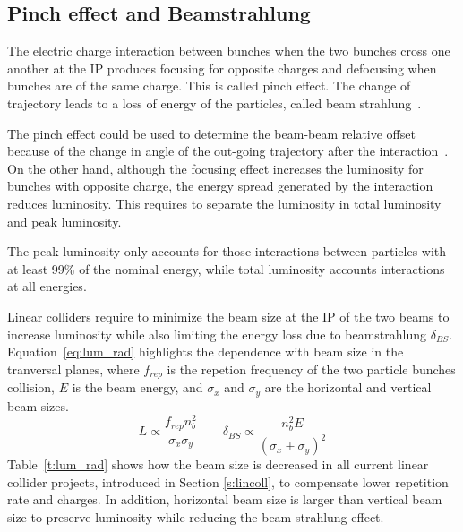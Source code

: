 \subsection{Pinch effect and Beamstrahlung}\label{s:beastr}
The electric charge interaction between bunches when the two bunches cross one another at the IP produces focusing for opposite charges and defocusing when bunches are of the same charge. This is called pinch effect. The change of trajectory leads to a loss of energy of the particles, called beam strahlung~\cite{Schulte:331845}.\par
The pinch effect could be used to determine the beam-beam relative offset because of the change in angle of the out-going trajectory after the interaction~\cite{Bambade:1989pb}. On the other hand, although the focusing effect increases the luminosity for bunches with opposite charge, the energy spread generated by the interaction reduces luminosity. This requires to separate the luminosity in total luminosity and peak luminosity.\par
The peak luminosity only accounts for those interactions between particles with at least 99\% of the nominal energy, while total luminosity accounts interactions at all energies.\par
Linear colliders require to minimize the beam size at the IP of the two beams to increase luminosity while also limiting the energy loss due to beamstrahlung $\delta_{BS}$. Equation~\ref{eq:lum_rad} highlights the dependence with beam size in the tranversal planes, where $f_{rep}$ is the repetion frequency of the two particle bunches collision, $E$ is the beam energy, and $\sigma_x$ and $\sigma_y$ are the horizontal and vertical beam sizes.
\begin{equation}
 L \propto \frac{f_{rep}n_b^2}{\sigma_x\sigma_y}\qquad\delta_{BS}\propto\frac{n_b^2E}{(\sigma_x+\sigma_y)^2}\label{eq:lum_rad}
\end{equation}
Table~\ref{t:lum_rad} shows how the beam size is decreased in all current linear collider projects, introduced in Section \ref{s:lincoll}, to compensate lower repetition rate and charges. In addition, horizontal beam size is larger than vertical beam size to preserve luminosity while reducing the beam strahlung effect.\par
